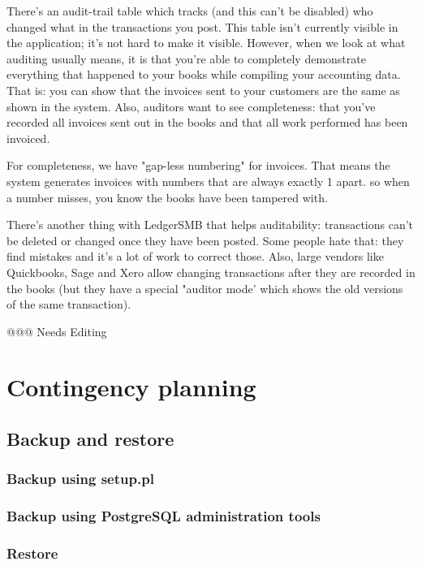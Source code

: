 There's an audit-trail table which tracks (and this can't be disabled) who changed what in the transactions you post. This table isn't currently visible in the application; it's not hard to make it visible. However, when we look at what auditing usually means, it is that you're able to completely demonstrate everything that happened to your books while compiling your accounting data. That is: you can show that the invoices sent to your customers are the same as shown in the system. Also, auditors want to see completeness: that you've recorded all invoices sent out in the books and that all work performed has been invoiced.

For completeness, we have "gap-less numbering" for invoices.
That means the system generates invoices with numbers that are always exactly 1 apart.
so when a number misses, you know the books have been tampered with.

There's another thing with LedgerSMB that helps auditability: transactions can't be deleted or changed once they have been posted. Some people hate that: they find mistakes and it's a lot of work to correct those. Also, large vendors like Quickbooks, Sage and Xero allow changing transactions after they are recorded in the books (but they have a special "auditor mode' which shows the old versions of the same transaction).

@@@ Needs Editing

\chapter{Contingency planning}
\label{cha-contingency}

\section{Backup and restore}
\label{sec-contingency-backup-restore}

\subsection{Backup using setup.pl}
\label{subsec-contingency-backup-setup-pl}


\subsection{Backup using PostgreSQL administration tools}
\label{subsec-contingency-backup-psql}

\subsection{Restore}
\label{subsec-contingency-restore}

